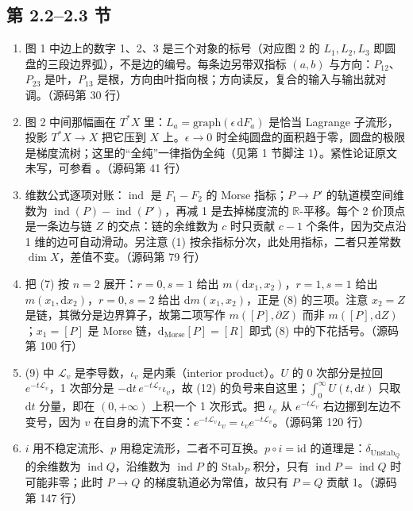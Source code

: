 \subsection*{第 2.2–2.3 节}
\begin{enumerate}
  \item 图 1 中边上的数字 1、2、3 是三个对象的标号（对应图 2 的 $L_1,L_2,L_3$ 即圆盘的三段边界弧），不是边的编号。每条边另带双指标 $(a,b)$ 与方向：$P_{12}$、$P_{23}$ 是叶，$P_{13}$ 是根，方向由叶指向根；方向读反，复合的输入与输出就对调。\hfill{\footnotesize （源码第 30 行）}
  \item 图 2 中间那幅画在 $T^*X$ 里：$L_a=\mathrm{graph}(\epsilon\,\mathrm{d}F_a)$ 是恰当 Lagrange 子流形，投影 $T^*X\to X$ 把它压到 $X$ 上。$\epsilon\to0$ 时全纯圆盘的面积趋于零，圆盘的极限是梯度流树；这里的“全纯”一律指伪全纯（见第 1 节脚注 1）。紧性论证原文未写，可参看 \cite{fukayaoh}。\hfill{\footnotesize （源码第 41 行）}
  \item 维数公式逐项对账：$\operatorname{ind}$ 是 $F_1-F_2$ 的 Morse 指标；$P\to P'$ 的轨道模空间维数为 $\operatorname{ind}(P)-\operatorname{ind}(P')$，再减 1 是去掉梯度流的 $\mathbb R$-平移。每个 2 价顶点是一条边与链 $Z$ 的交点：链的余维数为 $c$ 时只贡献 $c-1$ 个条件，因为交点沿 1 维的边可自动滑动。另注意 (1) 按余指标分次，此处用指标，二者只差常数 $\dim X$，差值不变。\hfill{\footnotesize （源码第 79 行）}
  \item 把 (7) 按 $n=2$ 展开：$r=0,s=1$ 给出 $m(\mathrm{d}x_1,x_2)$，$r=1,s=1$ 给出 $m(x_1,\mathrm{d}x_2)$，$r=0,s=2$ 给出 $\mathrm{d}m(x_1,x_2)$，正是 (8) 的三项。注意 $x_2=Z$ 是链，其微分是边界算子，故第二项写作 $m([P],\partial Z)$ 而非 $m([P],\mathrm{d}Z)$；$x_1=[P]$ 是 Morse 链，$\mathrm{d}_{\mathrm{Morse}}[P]=[R]$ 即式 (8) 中的下花括号。\hfill{\footnotesize （源码第 100 行）}
  \item (9) 中 $\mathcal L_v$ 是李导数，$\iota_v$ 是内乘（interior product）。$U$ 的 0 次部分是拉回 $e^{-t\mathcal L_v}$，1 次部分是 $-\mathrm{d}t\,e^{-t\mathcal L_v}\iota_v$，故 (12) 的负号来自这里；$\int_0^\infty U(t,\mathrm{d}t)$ 只取 $\mathrm{d}t$ 分量，即在 $(0,+\infty)$ 上积一个 1 次形式。把 $\iota_v$ 从 $e^{-t\mathcal L_v}$ 右边挪到左边不变号，因为 $v$ 在自身的流下不变：$e^{-t\mathcal L_v}\iota_v=\iota_v e^{-t\mathcal L_v}$。\hfill{\footnotesize （源码第 120 行）}
  \item $i$ 用不稳定流形、$p$ 用稳定流形，二者不可互换。$p\circ i=\mathrm{id}$ 的道理是：$\delta_{\mathrm{Unstab}_Q}$ 的余维数为 $\operatorname{ind}Q$，沿维数为 $\operatorname{ind}P$ 的 $\mathrm{Stab}_P$ 积分，只有 $\operatorname{ind}P=\operatorname{ind}Q$ 时可能非零；此时 $P\to Q$ 的梯度轨道必为常值，故只有 $P=Q$ 贡献 1。\hfill{\footnotesize （源码第 147 行）}

\end{enumerate}
